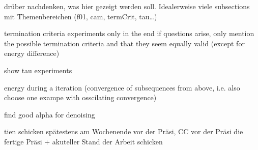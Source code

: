 \begin{frame}
  drüber nachdenken, was hier gezeigt werden soll. Idealerweise viele 
  subsections mit Themenbereichen (f01, cam, termCrit, tau\ldots)

  termination criteria experiments only in the end if questions arise, only
  mention the possible termination criteria and that they seem equally valid
  (except for energy difference)

  show tau experiments

  energy during a iteration (convergence of subsequences from above, i.e.
  also choose one exampe with osscilating convergence)

  find good alpha for denoising
\end{frame}

\begin{frame}
  tien schicken spätestens am Wochenende vor der Präsi, CC vor der Präsi
  die fertige Präsi + akuteller Stand der Arbeit schicken
\end{frame}
